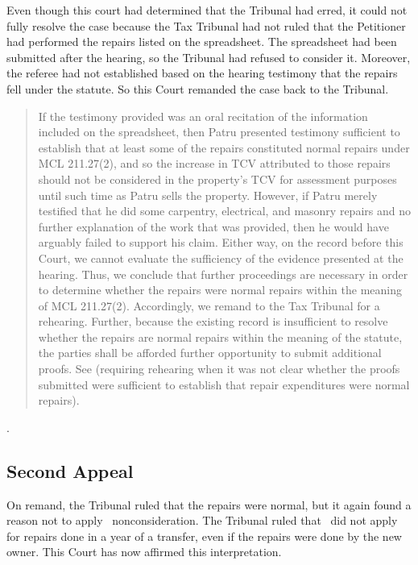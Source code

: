\documentclass[12pt,\documentclassflag]{michiganCourtOfAppealsBrief}
\begin{document}
Even though this court had determined that the Tribunal had erred, it could not fully resolve the case because the Tax Tribunal had not ruled that the Petitioner had performed the repairs listed on the spreadsheet. The spreadsheet had been submitted after the hearing, so the Tribunal had refused to consider it. Moreover, the referee had not established based on the hearing testimony that the repairs fell under the statute. So this Court remanded the case back to the Tribunal.

\begin{quote}
  \label{firstHolding}
If the testimony provided was an oral recitation of the
information included on the spreadsheet, then Patru presented testimony sufficient to establish
that at least some of the repairs constituted normal repairs under MCL 211.27(2), and so the
increase in TCV attributed to those repairs should not be considered in the property's TCV for
assessment purposes until such time as Patru sells the property. However, if Patru merely
testified that he did some carpentry, electrical, and masonry repairs and no further explanation of
the work that was provided, then he would have arguably failed to support his claim. Either way,
on the record before this Court, we cannot evaluate the sufficiency of the evidence presented at
the hearing. Thus, we conclude that further proceedings are necessary in order to determine
whether the repairs were normal repairs within the meaning of MCL 211.27(2). Accordingly, we
remand to the Tax Tribunal for a rehearing. Further, because the existing record is insufficient to
resolve whether the repairs are normal repairs within the meaning of the statute, the parties shall
be afforded further opportunity to submit additional proofs. See 
(requiring rehearing when it was not clear whether the
proofs submitted were sufficient to establish that repair expenditures were normal repairs).
\end{quote}
.

\subsection{Second Appeal}

On remand, the Tribunal ruled that the repairs were normal, but it again found a reason not to apply \mathieuGast\ nonconsideration. The Tribunal ruled that  \mathieuGast\ did not apply for repairs done in a year of a transfer, even if the repairs were done by the new owner.
This Court has now affirmed this interpretation.
\end{document}
